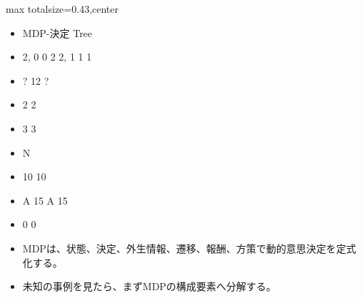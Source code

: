 \clearpage
{}
\begin{minipage}[t]{0.405\textwidth}
\begin{adjustbox}{max totalsize={\textwidth}{0.43\textheight},center}
\begin{minipage}{\textwidth}\scriptsize
{}\begin{itemize}
\item MDP-決定 Tree
\item 2, 0 0 2 2, 1 1 1
\item ? 12 ?
\item 2 2
\item 3 3
\item N
\item 10 10
\item A 15 A 15
\item 0 0
\end{itemize}\begin{itemize}
\item MDPは、状態、決定、外生情報、遷移、報酬、方策で動的意思決定を定式化する。
\item 未知の事例を見たら、まずMDPの構成要素へ分解する。
\end{itemize}
\end{minipage}
\end{adjustbox}
\end{minipage}\hfill
